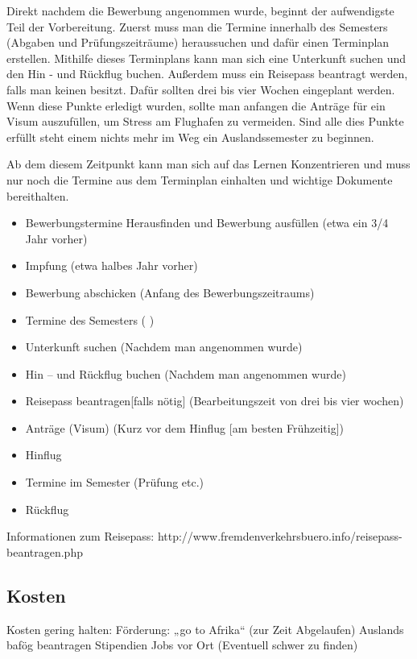\documentclass[11pt]{article}
\begin{document}
Direkt nachdem die Bewerbung angenommen wurde, beginnt der aufwendigste Teil der Vorbereitung. Zuerst muss man die Termine innerhalb des Semesters (Abgaben und Prüfungszeiträume) heraussuchen und dafür einen Terminplan erstellen.
Mithilfe dieses Terminplans kann man sich eine Unterkunft suchen und den Hin - und Rückflug buchen.  Außerdem muss ein Reisepass beantragt werden, falls man keinen besitzt. Dafür sollten drei bis vier Wochen eingeplant werden. Wenn diese Punkte erledigt wurden, sollte man anfangen die Anträge für ein Visum auszufüllen, um Stress am Flughafen zu vermeiden. Sind alle dies Punkte erfüllt steht einem nichts mehr im Weg ein Auslandssemester zu beginnen.

Ab dem diesem Zeitpunkt kann man sich auf das Lernen Konzentrieren und muss nur noch die Termine aus dem Terminplan einhalten und wichtige Dokumente bereithalten.

\begin{itemize}
\item Bewerbungstermine Herausfinden und Bewerbung ausfüllen (etwa ein 3/4 Jahr vorher)
\item Impfung					                           (etwa halbes Jahr vorher)
\item Bewerbung abschicken			(Anfang des Bewerbungszeitraums)
\item Termine des Semesters                                  ( )
\item Unterkunft suchen				(Nachdem man angenommen wurde)
\item Hin – und Rückflug buchen                           (Nachdem man angenommen wurde)
\item Reisepass beantragen[falls nötig]		(Bearbeitungszeit von drei bis vier wochen)
\item Anträge (Visum)				(Kurz vor dem Hinflug [am besten Frühzeitig])
\item Hinflug
\item Termine im Semester (Prüfung etc.)
\item Rückflug

\end{itemize}
Informationen zum Reisepass:
http://www.fremdenverkehrsbuero.info/reisepass-beantragen.php

\newpage

\subsection{Kosten}
Kosten gering halten:
Förderung: „go to Afrika“ (zur Zeit Abgelaufen)
Auslands bafög beantragen
Stipendien
Jobs vor Ort (Eventuell schwer zu finden)\\
\end{document}
